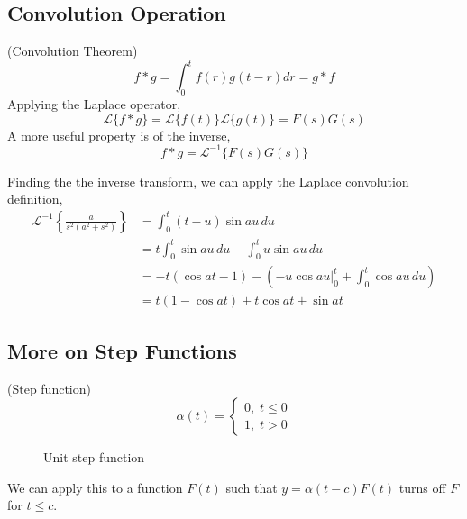 \subsection{Convolution Operation}

\begin{definition} (Convolution Theorem)
    \begin{equation}
        f * g = \int_0^t f(r) g(t-r)dr=g * f
    \end{equation}
    Applying the Laplace operator,
    \begin{equation}
        \mathcal{L}\{f*g\}=\mathcal{L}\{f(t)\}\mathcal{L}\{g(t)\}=F(s)G(s)
    \end{equation}
    A more useful property is of the inverse,
    \begin{equation}
        f*g=\mathcal{L}^{-1}\{F(s)G(s)\}
    \end{equation}
\end{definition}

\begin{example}
    Finding the the inverse transform, we can apply the Laplace convolution definition,
    \begin{align*}
        \mathcal{L}^{-1}\left\{\frac{a}{s^2(a^2+s^2)}\right\}&=\int_0^t (t-u)\sin au\,du\\
        &=t\int_0^t \sin au\, du -\int_0^t u\sin au\, du\\
        &=-t(\cos at - 1)-\left(-u\cos au\bigg\vert_0^t+\int_0^t \cos au\,du\right)\\
        &=t(1-\cos at)+t\cos at+\sin at
    \end{align*}
\end{example}

\subsection{More on Step Functions}

\begin{definition} (Step function)
    \begin{equation}
        \alpha(t)=\begin{cases}
            0,\;t\leq 0\\
            1,\;t>0
        \end{cases}
    \end{equation}
    \begin{figure}[H]
        \centering
        \caption{Unit step function}
    \end{figure}
    We can apply this to a function $F(t)$ such that $y=\alpha(t-c)F(t)$
    turns off $F$ for $t\leq c$.
\end{definition}

